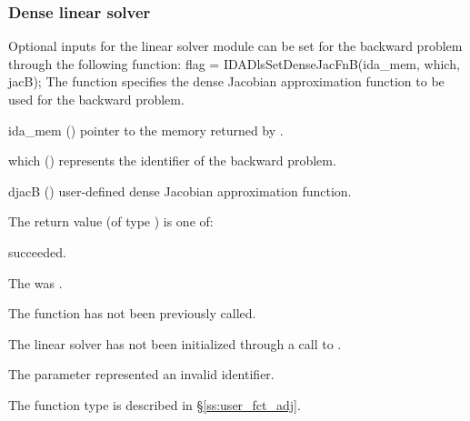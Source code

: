 \subsubsection{Dense linear solver}
Optional inputs for the {\idadense} linear solver module can be set for the backward
problem through the following function:
{
  flag = IDADlsSetDenseJacFnB(ida\_mem, which, jacB);
}
{
  The function  specifies the dense Jacobian
  approximation function to be used for the backward problem.
}
{
  \begin{args}
  \item[ida\_mem] ()
    pointer to the {\idas} memory returned by .
  \item[which] ()
    represents the identifier of the backward problem.
  \item[djacB] ()
    user-defined dense Jacobian approximation function.
  \end{args}
}
{
  The return value  (of type ) is one of:
  \begin{args}
  \item[\Id{IDADIRECT\_SUCCESS}] 
     succeeded.
  \item[\Id{IDADIRECT\_MEM\_NULL}]
    The  was .
  \item[\Id{IDADIRECT\_NO\_ADJ}]
    The function  has not been previously called.
  \item[\Id{IDADIRECT\_LMEM\_NULL}]
    The {\idadense} linear solver has not been initialized through a call to .
  \item[\Id{IDADIRECT\_ILL\_INPUT}]
    The parameter  represented an invalid identifier.
  \end{args}
}
{
  The function type  is described in \S\ref{ss:user_fct_adj}.
}


